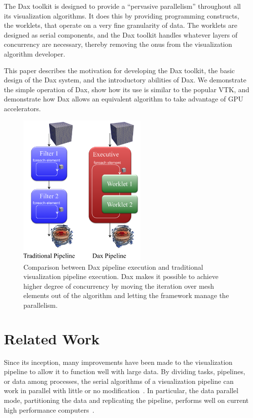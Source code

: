 \documentclass{vgtc}                          %
\newcommand*{\lcite}[1]{~\cite{#1}}
\begin{document}
The Dax toolkit is designed to provide a ``pervasive parallelism''
throughout all its visualization algorithms.  It does this by providing
programming constructs, the worklets, that operate on a very fine
granularity of data.  The worklets are designed as serial components, and
the Dax toolkit handles whatever layers of concurrency are necessary,
thereby removing the onus from the visualization algorithm developer.

This paper describes the motivation for developing the Dax toolkit, the
basic design of the Dax system, and the introductory abilities of Dax.  We
demonstrate the simple operation of Dax, show how its use is similar to the
popular VTK, and demonstrate how Dax allows an equivalent algorithm to take
advantage of GPU accelerators.

\begin{figure}
  \centering
  \includegraphics[width=2.5in]{images/DaxPipelineVsTraditionalPipeline}
  \caption{Comparison between Dax pipeline execution and traditional
    visualization pipeline execution. Dax makes it possible to achieve higher
    degree of concurrency by moving the iteration over mesh elements out of the
    algorithm and letting the framework manage the parallelism.}
  \label{fig:DaxPipelineVsTraditionalPipeline}
\end{figure}

\section{Related Work}
\label{sec:RelatedWork}

Since its inception, many improvements have been made to the visualization
pipeline to allow it to function well with large data.  By dividing tasks,
pipelines, or data among processes, the serial algorithms of a
visualization pipeline can work in parallel with little or no
modification\lcite{Ahrens00}.  In particular, the data parallel
mode, partitioning the data and replicating the pipeline, performs
well on current high performance computers\lcite{Cedilnik06}.
\end{document}
